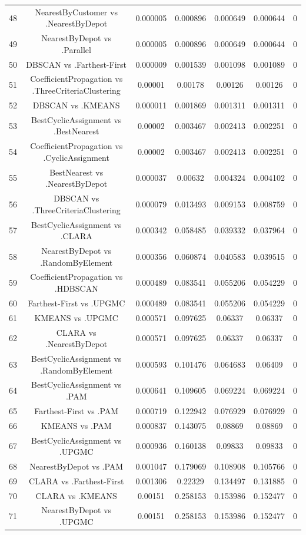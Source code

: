 \documentclass[a4paper,10pt]{article}
\begin{document}
\begin{landscape}
\begin{table}[!htp]
\begin{tabular}{ccccccc}
48&NearestByCustomer vs .NearestByDepot&0.000005&0.000896&0.000649&0.000644&0\\
49&NearestByDepot vs .Parallel&0.000005&0.000896&0.000649&0.000644&0\\
50&DBSCAN vs .Farthest-First&0.000009&0.001539&0.001098&0.001089&0\\
51&CoefficientPropagation vs .ThreeCriteriaClustering&0.00001&0.00178&0.00126&0.00126&0\\
52&DBSCAN vs .KMEANS&0.000011&0.001869&0.001311&0.001311&0\\
53&BestCyclicAssignment vs .BestNearest&0.00002&0.003467&0.002413&0.002251&0\\
54&CoefficientPropagation vs .CyclicAssignment&0.00002&0.003467&0.002413&0.002251&0\\
55&BestNearest vs .NearestByDepot&0.000037&0.00632&0.004324&0.004102&0\\
56&DBSCAN vs .ThreeCriteriaClustering&0.000079&0.013493&0.009153&0.008759&0\\
57&BestCyclicAssignment vs .CLARA&0.000342&0.058485&0.039332&0.037964&0\\
58&NearestByDepot vs .RandomByElement&0.000356&0.060874&0.040583&0.039515&0\\
59&CoefficientPropagation vs .HDBSCAN&0.000489&0.083541&0.055206&0.054229&0\\
60&Farthest-First vs .UPGMC&0.000489&0.083541&0.055206&0.054229&0\\
61&KMEANS vs .UPGMC&0.000571&0.097625&0.06337&0.06337&0\\
62&CLARA vs .NearestByDepot&0.000571&0.097625&0.06337&0.06337&0\\
63&BestCyclicAssignment vs .RandomByElement&0.000593&0.101476&0.064683&0.06409&0\\
64&BestCyclicAssignment vs .PAM&0.000641&0.109605&0.069224&0.069224&0\\
65&Farthest-First vs .PAM&0.000719&0.122942&0.076929&0.076929&0\\
66&KMEANS vs .PAM&0.000837&0.143075&0.08869&0.08869&0\\
67&BestCyclicAssignment vs .UPGMC&0.000936&0.160138&0.09833&0.09833&0\\
68&NearestByDepot vs .PAM&0.001047&0.179069&0.108908&0.105766&0\\
69&CLARA vs .Farthest-First&0.001306&0.22329&0.134497&0.131885&0\\
70&CLARA vs .KMEANS&0.00151&0.258153&0.153986&0.152477&0\\
71&NearestByDepot vs .UPGMC&0.00151&0.258153&0.153986&0.152477&0\\

\end{tabular}
\end{table}
\end{landscape}
\end{document}
